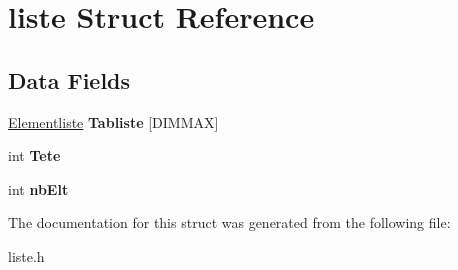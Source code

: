 \hypertarget{structliste}{}\section{liste Struct Reference}
\label{structliste}
\subsection*{Data Fields}
\begin{DoxyCompactItemize}
\item 
\mbox{\label{structliste_a5306c3d8ec2ffff7bc66e76132cc395e}} 
\mbox{\hyperlink{structs__arc__p}{Elementliste}} {\bfseries Tabliste} \mbox{[}D\+I\+M\+M\+AX\mbox{]}
\item 
\mbox{\label{structliste_ac27f6a14865441ed2e343acc6738aad2}} 
int {\bfseries Tete}
\item 
\mbox{\label{structliste_ac6a9b89b3dd1181842948cdc6a1ee389}} 
int {\bfseries nb\+Elt}
\end{DoxyCompactItemize}


The documentation for this struct was generated from the following file\+:\begin{DoxyCompactItemize}
\item 
liste.\+h\end{DoxyCompactItemize}
